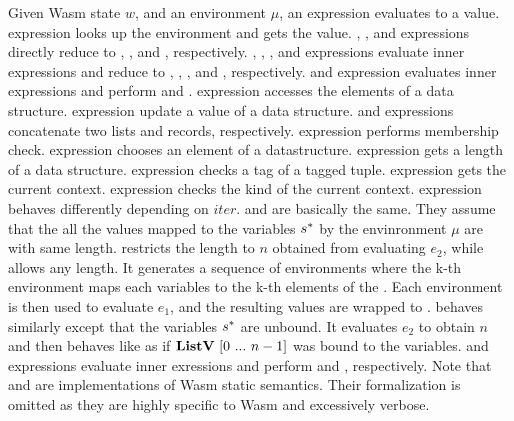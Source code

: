 Given Wasm state $w$, and an environment $\mu$, an expression evaluates to a
value.
\vare{} expression looks up the environment and gets the value.
\nume{}, \boole{}, and \fnamee{} expressions directly reduce to \numv{},
\boolv{}, and \fnamev{}, respectively.
\liste{}, \stre{}, \tupe{}, and \casee{} expressions evaluate inner expressions
and reduce to \listv{}, \strv{}, \tupv{}, and \casev{}, respectively.
\une{} and \bine{} expression evaluates inner expressions and perform \unop{}
and \binop{}.
\acce{} expression accesses the elements of a data structure.
\upde{} expression update a value of a data structure.
\cate{} and \compe{} expressions concatenate two lists and records,
respectively.
\meme{} expression performs membership check.
\choosee{} expression chooses an element of a datastructure.
\lene{} expression gets a length of a data structure.
\iscaseofe{} expression checks a tag of a tagged tuple.
\getcurctxe{} expression gets the current context.
\ctxkinde{} expression checks the kind of the current context.
\itere{} expression behaves differently depending on $iter$.
\listiter{} and \listniter{} are basically the same.
They assume that the all the values mapped to the variables $s^*$ by the
envinronment $\mu${} are \listv{} with same length.
\listniter{} restricts the length to $n$ obtained from evaluating $e_2$,
while \listiter{} allows any length.
It generates a sequence of environments where the k-th environment maps each
variables to the k-th elements of the \listv{}.
Each environment is then used to evaluate $e_1$, and the resulting values are
wrapped to \listv{}.
\listidxiter{} behaves similarly except that the variables $s^*$ are
unbound.
It evaluates $e_2$ to obtain $n$ and then behaves like \listniter{} as if
$\textbf{ListV} ~ [0 ~ ... ~ n-1]$ was bound to the variables.
\matche{} and \hastypee{} expressions evaluate inner exressions and perform
\match{} and \hastype{}, respectively.
Note that \match{} and \hastype{} are implementations of Wasm static semantics.
Their formalization is omitted as they are highly specific to Wasm and
excessively verbose.





